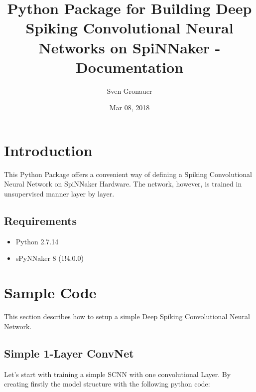 \documentclass[letterpaper,10pt,english]{sphinxmanual}
\title{Python Package for Building Deep Spiking Convolutional Neural Networks on SpiNNaker - Documentation}
\date{Mar 08, 2018}
\author{Sven Gronauer}
\begin{document}
\maketitle
\sphinxtableofcontents
{}\label{\detokenize{index::doc}}



\chapter{Introduction}
\label{\detokenize{introduction:introduction}}\label{\detokenize{introduction::doc}}\label{\detokenize{introduction:welcome-to-the-documentation}}
This Python Package offers a convenient way of defining a Spiking Convolutional Neural Network on SpiNNaker Hardware.
The network, however, is trained in unsupervised manner layer by layer.


\section{Requirements}
\label{\detokenize{introduction:requirements}}\begin{itemize}
\item {} 
Python 2.7.14

\item {} 
sPyNNaker 8 (1!4.0.0)

\end{itemize}


\chapter{Sample Code}
\label{\detokenize{samplecode::doc}}\label{\detokenize{samplecode:sample-code}}
This section describes how to setup a simple Deep Spiking Convolutional Neural Network.


\section{Simple 1-Layer ConvNet}
\label{\detokenize{samplecode:simple-1-layer-convnet}}
Let’s start with training a simple SCNN with one convolutional Layer. By creating firstly the model structure with the following python code:

\begin{sphinxVerbatim}[commandchars=\\\{\}]
   
 
\end{sphinxVerbatim}
\end{document}

